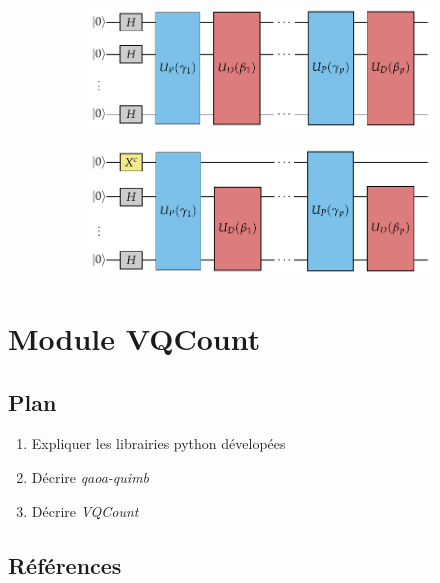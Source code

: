 \begin{figure}[t]
    \centering
    \begin{subfigure}[h]{0.45\textwidth}
    \centering
    \includegraphics[width=1\textwidth]{figures/qaoa-self-reducibility-1.pdf}
    \caption{}
    \label{fig:quantum-circuit-a}
    \end{subfigure}
    \begin{subfigure}[h]{0.45\textwidth}
    \centering
    \includegraphics[width=1\textwidth]{figures/qaoa-self-reducibility-2.pdf}
    \caption{}
    \label{fig:quantum-circuit-b}
    \end{subfigure}
\caption[Circuit VQCount]{}
\label{fig:vqcount-circuit}
\end{figure}



\section{Module VQCount}

\subsection*{Plan}

\begin{enumerate}
    \item Expliquer les librairies python dévelopées
    \item Décrire \textit{qaoa-quimb}
    \item Décrire \textit{VQCount}
\end{enumerate}

\subsection*{Références}